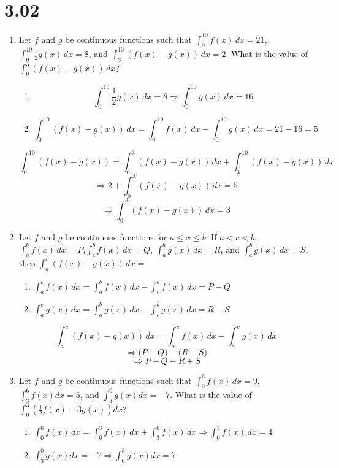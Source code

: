 \documentclass[12pt]{article}
\begin{document}
\section*{3.02}
\begin{enumerate}
    \item Let $f$ and $g$ be continuous functions such that $\int_{0}^{10} f(x) \, dx =21$, $\int_{0}^{10} \frac{1}{2}g(x) \, dx =8$, and $\int_{3}^{10} (f(x)-g(x)) \, dx=2$. What is the value of $\int_{0}^{3}(f(x)-g(x)) \,dx$?
   
\begin{enumerate}
    \item $$\int_{0}^{10} \frac{1}{2}g(x) \, dx =8 \Longrightarrow \int_{0}^{10} g(x) \, dx =16$$
     \item $$\int_{0}^{10} (f(x)-g(x)) \, dx=  \int_{0}^{10} f(x) \, dx - \int_{0}^{10} g(x) \,dx = 21-16=5$$
\end{enumerate}
    $$\int_{0}^{10} (f(x)-g(x)) = \int_{0}^{3} (f(x)-g(x)) \, dx  + \int_{3}^{10} (f(x)-g(x)) \, dx$$
    $$\Longrightarrow 2 + \int_{0}^{3} (f(x)-g(x)) \, dx = 5$$
    $$\Longrightarrow \boxed{\int_{0}^{3} (f(x)-g(x)) \, dx =3}$$
    
\item Let $f$ and $g$ be continuous functions for $a \leq x \leq b$. If $a<c<b$, $\int_{a}^{b} f(x) \, dx=P$,$\int_{c}^{b} f(x) \, dx=Q$, $\int_{a}^{b} g(x) \, dx=R$, and $\int_{c}^{b} g(x) \, dx=S$, then $\int_{a}^{c} (f(x)-g(x)) \, dx=$
\begin{enumerate}
    \item $\int_{a}^{c} f(x) \, dx =\int_{a}^{b} f(x) \, dx - \int_{c}^{b} f(x) \, dx = P-Q$
     \item $\int_{a}^{c} g(x) \, dx =\int_{a}^{b} g(x) \, dx - \int_{c}^{b} g(x) \, dx = R-S$
\end{enumerate}
$$\int_{a}^{c} (f(x)-g(x)) \, dx= \int_{a}^{c} f(x) \, dx - \int_{a}^{c} g(x) \, dx $$
$$\Longrightarrow \big(P-Q \big) - \big(R-S \big)$$
$$\Longrightarrow \boxed{P-Q-R+S}$$

\item Let $f$ and $g$ be continuous functions such that $\int^{6}_{0} f(x)\,dx=9$,\\ $\int^{6}_{3} f(x)dx=5$, and $\int^{0}_{3} g(x)dx=-7$. What is the value of $\int^{3}_{0}(\frac{1}{2}f(x)-3g(x))dx$?
\begin{enumerate}
    \item $\int_{0}^{6} f(x) \, dx = \int_{0}^{3} f(x) \, dx + \int_{3}^{6} f(x) \, dx \Longrightarrow \int_{0}^{3} f(x) \, dx = 4$
    \item  $\int^{0}_{3} g(x)dx=-7 \Longrightarrow \int^{3}_{0} g(x)dx=7$
\end{enumerate}


\end{enumerate}
\end{document}

